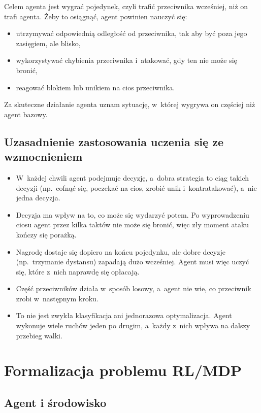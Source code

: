 \documentclass[12pt]{article}
\begin{document}
Celem agenta jest wygrać pojedynek, czyli trafić przeciwnika wcześniej, niż on trafi agenta. Żeby to osiągnąć, agent powinien nauczyć się:
\begin{itemize}
    \item utrzymywać odpowiednią odległość od przeciwnika, tak aby być poza jego zasięgiem, ale blisko,
    \item wykorzystywać chybienia przeciwnika i~atakować, gdy ten nie może się bronić,
    \item reagować blokiem lub unikiem na cios przeciwnika.
\end{itemize}

Za skuteczne działanie agenta uznam sytuację, w~której wygrywa on częściej niż agent bazowy.


\subsection{Uzasadnienie zastosowania uczenia się ze wzmocnieniem}

\begin{itemize}
    \item W~każdej chwili agent podejmuje decyzję, a~dobra strategia to ciąg takich decyzji (np.\ cofnąć się, poczekać na cios, zrobić unik i~kontratakować), a~nie jedna decyzja.
    \item Decyzja ma wpływ na to, co może się wydarzyć potem. Po wyprowadzeniu ciosu agent przez kilka taktów nie może się bronić, więc zły moment ataku kończy się porażką.
    \item Nagrodę dostaje się dopiero na końcu pojedynku, ale dobre decyzje (np.\ trzymanie dystansu) zapadają dużo wcześniej. Agent musi więc uczyć się, które z~nich naprawdę się opłacają.
    \item Część przeciwników działa w~sposób losowy, a~agent nie wie, co przeciwnik zrobi w~następnym kroku.
    \item To nie jest zwykła klasyfikacja ani jednorazowa optymalizacja. Agent wykonuje wiele ruchów jeden po drugim, a~każdy z~nich wpływa na dalszy przebieg walki.
\end{itemize}

\section{Formalizacja problemu RL/MDP}

\subsection{Agent i środowisko}
\end{document}
